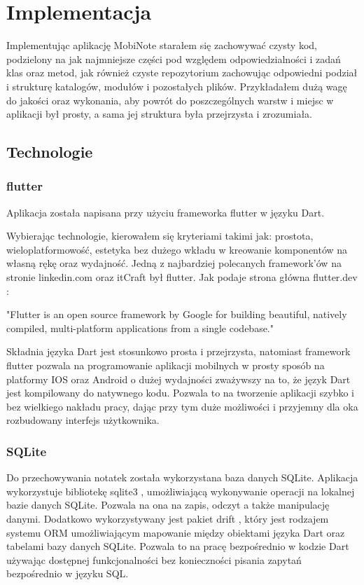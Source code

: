 \chapter{Implementacja}
    
Implementując aplikację MobiNote starałem się zachowywać czysty kod, podzielony na jak najmniejsze części pod względem odpowiedzialności i zadań klas oraz metod, jak również czyste repozytorium zachowując odpowiedni podział i strukturę katalogów, modułów i pozostałych plików. Przykładałem dużą wagę do jakości oraz wykonania, aby powrót do poszczególnych warstw i miejsc w aplikacji był prosty, a sama jej struktura była przejrzysta i zrozumiała. 

\section{Technologie}

\subsection{flutter}

Aplikacja została napisana przy użyciu frameworka flutter w języku Dart.

Wybierając technologie, kierowałem się kryteriami takimi jak: prostota, wieloplatformowość, estetyka bez dużego wkładu w kreowanie komponentów na własną rękę oraz wydajność. Jedną z najbardziej polecanych framework'ów na stronie  linkedin.com \cite{linkedin} oraz itCraft \cite{itCraft} był flutter. Jak podaje strona główna flutter.dev \cite{flutter}:

"Flutter is an open source framework by Google for building beautiful, natively compiled, multi-platform applications from a single codebase."

Składnia języka Dart jest stosunkowo prosta i przejrzysta, natomiast framework flutter pozwala na programowanie aplikacji mobilnych w prosty sposób na platformy IOS oraz Android o dużej wydajności zważywszy na to, że język Dart jest kompilowany do natywnego kodu. Pozwala to na tworzenie aplikacji szybko i bez wielkiego nakładu pracy, dając przy tym duże możliwości i przyjemny dla oka rozbudowany interfejs użytkownika.

\subsection{SQLite}

Do przechowywania notatek została wykorzystana baza danych SQLite. Aplikacja wykorzystuje bibliotekę sqlite3 \cite{sqlite3}, umożliwiającą wykonywanie operacji na lokalnej bazie danych SQLite. Pozwala na ona na zapis, odczyt a także manipulację danymi. Dodatkowo wykorzystywany jest pakiet drift \cite{drift}, który jest rodzajem systemu ORM umożliwiającym mapowanie między obiektami języka Dart oraz tabelami bazy danych SQLite. Pozwala to na pracę bezpośrednio w kodzie Dart używając dostępnej funkcjonalności bez konieczności pisania zapytań bezpośrednio w języku SQL.

